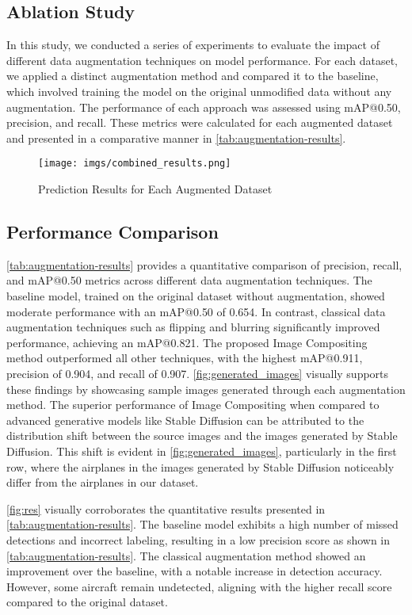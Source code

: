 \subsection{Ablation Study}
In this study, we conducted a series of experiments to evaluate the impact of different data augmentation techniques on model performance. For each dataset, we applied a distinct augmentation method and compared it to the baseline, which involved training the model on the original unmodified data without any augmentation. The performance of each approach was assessed using mAP@0.50, precision, and recall. These metrics were calculated for each augmented dataset and presented in a comparative manner in \autoref{tab:augmentation-results}.

\begin{figure*}[ht]
  \centering
\texttt{[image: imgs/combined\_results.png]}  
\caption{Prediction Results for Each Augmented Dataset}
  \label{fig:res}
 \end{figure*}
\subsection{Performance Comparison}
\autoref{tab:augmentation-results} provides a quantitative comparison of precision, recall, and mAP@0.50 metrics across different data augmentation techniques. The baseline model, trained on the original dataset without augmentation, showed moderate performance with an mAP@0.50 of 0.654. In contrast, classical data augmentation techniques such as flipping and blurring significantly improved performance, achieving an mAP@0.821. The proposed Image Compositing method outperformed all other techniques, with the highest mAP@0.911, precision of 0.904, and recall of 0.907. \autoref{fig:generated_images} visually supports these findings by showcasing sample images generated through each augmentation method. The superior performance of Image Compositing when compared to advanced generative models like Stable Diffusion can be attributed to the distribution shift between the source images and the images generated by Stable Diffusion. This shift is evident in \autoref{fig:generated_images}, particularly in the first row, where the airplanes in the images generated by Stable Diffusion noticeably differ from the airplanes in our dataset. %

\autoref{fig:res} visually corroborates the quantitative results presented in \autoref{tab:augmentation-results}. The baseline model exhibits a high number of missed detections and incorrect labeling, resulting in a low precision score as shown in \autoref{tab:augmentation-results}. The classical augmentation method showed an improvement over the baseline, with a notable increase in detection accuracy. However, some aircraft remain undetected, aligning with the higher recall score compared to the original dataset. 

